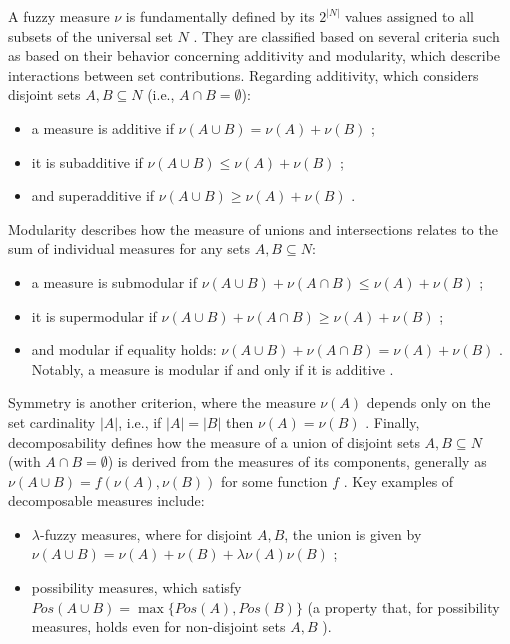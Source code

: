 A fuzzy measure $\nu$ is fundamentally defined by its $2^{|N|}$ values assigned to all subsets of the universal set $N$ \cite[p. 41]{beliakov2023discrete}. They are classified based on several criteria such as based on their behavior concerning additivity and modularity, which describe interactions between set contributions.
Regarding additivity, which considers disjoint sets $A,B \subseteq N$ (i.e., $A \cap B = \emptyset$):
\begin{itemize}
    \item a measure is additive if $\nu(A \cup B) = \nu(A) + \nu(B)$ \cite[Def. 2.4, Eq. 2.1]{beliakov2023discrete};
    \item it is subadditive if $\nu(A \cup B) \leq \nu(A) + \nu(B)$ \cite[Def. 2.10, Eq. 2.8]{beliakov2023discrete};
    \item and superadditive if $\nu(A \cup B) \geq \nu(A) + \nu(B)$ \cite[Def. 2.10, Eq. 2.9]{beliakov2023discrete}.
\end{itemize}
Modularity describes how the measure of unions and intersections relates to the sum of individual measures for any sets $A,B \subseteq N$:
\begin{itemize}
    \item a measure is submodular if $\nu(A \cup B) + \nu(A \cap B) \leq \nu(A) + \nu(B)$ \cite[Def. 2.8, Eq. 2.3]{beliakov2023discrete};
    \item it is supermodular if $\nu(A \cup B) + \nu(A \cap B) \geq \nu(A) + \nu(B)$ \cite[Def. 2.8, Eq. 2.4]{beliakov2023discrete};
    \item and modular if equality holds: $\nu(A \cup B) + \nu(A \cap B) = \nu(A) + \nu(B)$ \cite[Eq. 2.5]{beliakov2023discrete}. Notably, a measure is modular if and only if it is additive \cite[Note 2.6]{beliakov2023discrete}.
\end{itemize}
Symmetry is another criterion, where the measure $\nu(A)$ depends only on the set cardinality $|A|$, i.e., if $|A|=|B|$ then $\nu(A)=\nu(B)$ \cite[Def. 2.6]{beliakov2023discrete}. Finally, decomposability defines how the measure of a union of disjoint sets $A, B \subseteq N$ (with $A \cap B = \emptyset$) is derived from the measures of its components, generally as $\nu(A \cup B) = f(\nu(A), \nu(B))$ for some function $f$ \cite[Def. 2.20, Eq. 2.18]{beliakov2023discrete}. Key examples of decomposable measures include:
\begin{itemize}
    \item $\lambda$-fuzzy measures, where for disjoint $A,B$, the union is given by $\nu(A \cup B) = \nu(A) + \nu(B) + \lambda\nu(A)\nu(B)$ \cite[Def. 2.18, Eq. 2.14]{beliakov2023discrete};
    \item possibility measures, which satisfy $Pos(A \cup B) = \max\{Pos(A), Pos(B)\}$ (a property that, for possibility measures, holds even for non-disjoint sets $A,B$ \cite[Def. 2.14]{beliakov2023discrete}).
\end{itemize}


